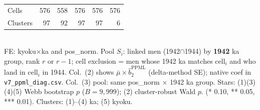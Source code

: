 \begin{table}[!htbp]
\begin{tabular}{lrrrrr}
    Cells & 576 & 558 & 576 & 576 & 576 \\
    Clusters & 97 & 92 & 97 & 97 & 6 \\
    \hline\hline
  \end{tabular}
  \\[4pt]
  \footnotesize
  FE: kyoku$\times$ka and pos\_norm. Pool $S_i$: linked men (1942$\cap$1944) by \textbf{1942} ka group, rank $r$ or $r{-}1$;
  cell exclusion = men whose 1942 ka matches cell$_i$ and who land in cell$_i$ in 1944.
  Col.\ (2) shows $\bar{\mu}\times\hat{b}_2^{\text{PPML}}$ (delta-method SE); native coef in \texttt{v7\_ppml\_diag.csv}.
  Col.\ (3) pool: same pos\_norm $\times$ 1942 ka group.
  Stars: (1)(3)(4)(5) Webb bootstrap $p$ ($B{=}9{,}999$); (2) cluster-robust Wald $p$.
  (* 0.10, ** 0.05, *** 0.01). Clusters: (1)--(4) ka; (5) kyoku.
\end{table}
